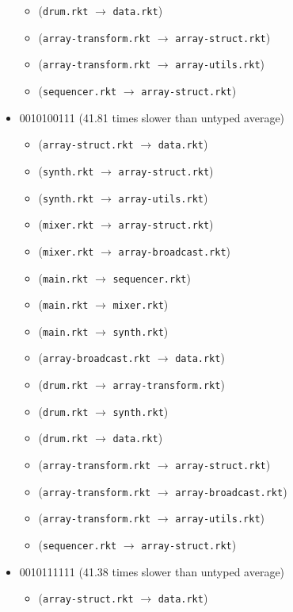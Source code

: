 \documentclass{article}
\newcommand{\mono}[1]{\texttt{#1}}
\begin{document}
\begin{itemize}
\begin{itemize}
  \item (\mono{drum.rkt} $\rightarrow$ \mono{data.rkt})
  \item (\mono{array-transform.rkt} $\rightarrow$ \mono{array-struct.rkt})
  \item (\mono{array-transform.rkt} $\rightarrow$ \mono{array-utils.rkt})
  \item (\mono{sequencer.rkt} $\rightarrow$ \mono{array-struct.rkt})
  \end{itemize}
\item 0010100111 (41.81 times slower than untyped average)
  \begin{itemize}
  \item (\mono{array-struct.rkt} $\rightarrow$ \mono{data.rkt})
  \item (\mono{synth.rkt} $\rightarrow$ \mono{array-struct.rkt})
  \item (\mono{synth.rkt} $\rightarrow$ \mono{array-utils.rkt})
  \item (\mono{mixer.rkt} $\rightarrow$ \mono{array-struct.rkt})
  \item (\mono{mixer.rkt} $\rightarrow$ \mono{array-broadcast.rkt})
  \item (\mono{main.rkt} $\rightarrow$ \mono{sequencer.rkt})
  \item (\mono{main.rkt} $\rightarrow$ \mono{mixer.rkt})
  \item (\mono{main.rkt} $\rightarrow$ \mono{synth.rkt})
  \item (\mono{array-broadcast.rkt} $\rightarrow$ \mono{data.rkt})
  \item (\mono{drum.rkt} $\rightarrow$ \mono{array-transform.rkt})
  \item (\mono{drum.rkt} $\rightarrow$ \mono{synth.rkt})
  \item (\mono{drum.rkt} $\rightarrow$ \mono{data.rkt})
  \item (\mono{array-transform.rkt} $\rightarrow$ \mono{array-struct.rkt})
  \item (\mono{array-transform.rkt} $\rightarrow$ \mono{array-broadcast.rkt})
  \item (\mono{array-transform.rkt} $\rightarrow$ \mono{array-utils.rkt})
  \item (\mono{sequencer.rkt} $\rightarrow$ \mono{array-struct.rkt})
  \end{itemize}
\item 0010111111 (41.38 times slower than untyped average)
  \begin{itemize}
  \item (\mono{array-struct.rkt} $\rightarrow$ \mono{data.rkt})

\end{itemize}
\end{itemize}
\end{document}
